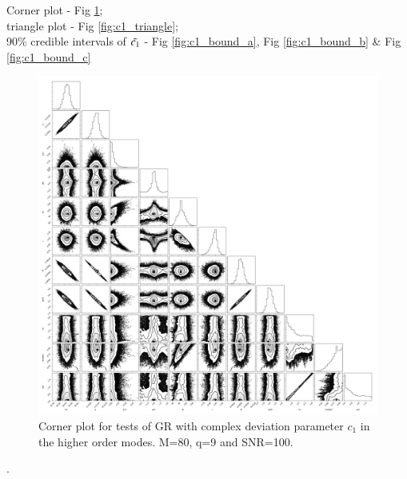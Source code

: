 \documentclass[prd,preprintnumbers,twocolumn,eqsecnum,floatfix,a4paper,nofootinbib,superscriptaddress]{revtex4}
\begin{document}
\newpage 
\noindent Corner plot  - Fig \ref{fig:c1_corner};\\
triangle plot - Fig \ref{fig:c1_triangle};\\
90\% credible intervals of $\Tilde{c_1}$  - Fig \ref{fig:c1_bound_a}, Fig \ref{fig:c1_bound_b} \& Fig \ref{fig:c1_bound_c}
\newpage

\begin{figure}[tbh]
\begin{center}
\includegraphics[scale=0.25]{figs/c1_80_9_100_corner_plot_wo_burnin.png} 
\end{center} 
\caption{Corner plot for tests of GR with complex deviation parameter $c_1$ in the higher order modes. M=80, q=9 and SNR=100.}
\label{fig:c1_corner}
\end{figure}

\newpage
.
\newpage 
\end{document}
